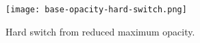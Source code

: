 \begin{figure}[h]
	\begin{center}
		\texttt{[image: base-opacity-hard-switch.png]}
		\caption{Hard switch from reduced maximum opacity.}
		\label{scenariobaseopacity}
	\end{center}
\end{figure}


























